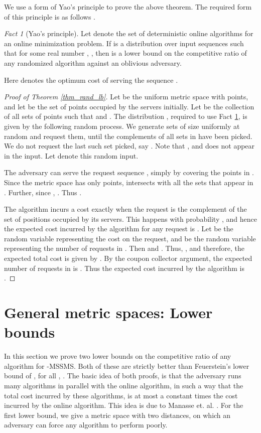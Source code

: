 \documentclass[11pt]{article}
\theoremstyle{plain}\newtheorem{theorem}{Theorem}
\theoremstyle{definition}
\theoremstyle{remark}
\newtheorem{fact}{Fact}
\begin{document}
We use a form of Yao's principle \cite{Yao77} to prove the above theorem.
The required form of this principle is as follows \cite{BorodinE99,StougieV02}.

\begin{fact}[Yao's principle]\label{fact_yao}
Let  denote the set of deterministic online algorithms for an online minimization problem. If  is a distribution over input sequences such that for some real number , , 
then  is a lower bound on the competitive ratio of any randomized algorithm against an oblivious adversary.
\end{fact}

Here  denotes the optimum cost of serving the sequence .

\begin{proof}[Proof of Theorem \ref{thm_rand_lb}]
Let  be the uniform metric space with  points, and let  be the set of points occupied by the servers initially. Let  be the collection of all sets of points  such that  and . The distribution , required to use Fact \ref{fact_yao}, is given by the following random process. We generate sets of size  uniformly at random and request them, until the complements of all sets in  have been picked. We do not request the last such set picked, say . Note that , and  does not appear in the input. Let  denote this random input.

The adversary can serve the request sequence , simply by covering the points in . Since the metric space has only  points,  intersects with all the sets that appear in . Further, since , . Thus 
.


The algorithm incurs a cost exactly when the request is the complement of the set of positions occupied by its servers. This happens with probability , and hence the expected cost incurred by the algorithm for any request is . Let  be the random variable representing the cost on the  request, and  be the random variable representing the number of requests in . Then  and . Thus, , and therefore, the expected total cost is given by . 
By the coupon collector argument, the expected number of requests in  is . Thus the expected cost incurred by the algorithm is .
\end{proof}

\section{General metric spaces: Lower bounds}\label{sec_general_lb}

In this section we prove two lower bounds on the competitive ratio of any algorithm for -MSSMS. Both of these are strictly better than Feuerstein's lower bound \cite{Feuerstein98} of , for all , . The basic idea of both proofs, is that the adversary runs many algorithms in parallel with the online algorithm, in such a way that the total cost incurred by these algorithms, is at most a constant times the cost incurred by the online algorithm. This idea is due to Manasse et. al. \cite{ManasseMS88}. For the first lower bound, we give a metric space with two distances, on which an adversary can force any algorithm to perform poorly.
\end{document}

